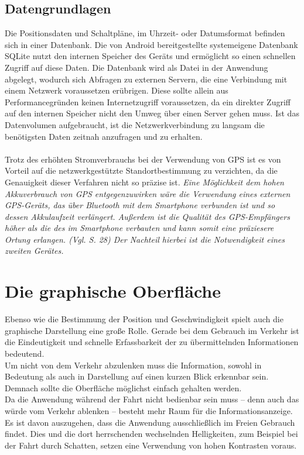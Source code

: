 \subsection{Datengrundlagen}
Die Positionsdaten und Schaltpläne, im Uhrzeit- oder Datumsformat befinden sich in einer Datenbank. Die von Android bereitgestellte systemeigene Datenbank SQLite nutzt den internen Speicher des Geräts und ermöglicht so einen schnellen Zugriff auf diese Daten. Die Datenbank wird als Datei in der Anwendung abgelegt, wodurch sich Abfragen zu externen Servern, die eine Verbindung mit einem Netzwerk voraussetzen erübrigen. Diese sollte allein aus Performancegründen keinen Internetzugriff voraussetzen, da ein direkter Zugriff auf den internen Speicher nicht den Umweg über einen Server gehen muss. Ist das Datenvolumen aufgebraucht, ist die Netzwerkverbindung zu langsam die benötigsten Daten zeitnah anzufragen und zu erhalten.\\\\
Trotz des erhöhten Stromverbrauchs bei der Verwendung von \gls{GPS} ist es von Vorteil auf die netzwerkgestützte Standortbestimmung zu verzichten, da die Genauigkeit dieser Verfahren nicht so präzise ist. 
\textit{Eine Möglichkeit dem hohen Akkuverbrauch von \gls{GPS} entgegenzuwirken wäre die Verwendung eines externen \gls{GPS}-Geräts, das über Bluetooth mit dem \gls{Smartphone} verbunden ist und so dessen Akkulaufzeit verlängert. Außerdem ist die Qualität des \gls{GPS}-Empfängers höher als die des im \gls{Smartphone} verbauten und kann somit eine präziesere Ortung erlangen. (Vgl. \cite{gps} S. 28) Der Nachteil hierbei ist die Notwendigkeit eines zweiten Gerätes.} 
\clearpage
\section{Die graphische Oberfläche}
Ebenso wie die Bestimmung der Position und Geschwindigkeit spielt auch die graphische Darstellung eine große Rolle. Gerade bei dem Gebrauch im Verkehr ist die Eindeutigkeit und schnelle Erfassbarkeit der zu übermittelnden Informationen bedeutend.  \\
Um nicht von dem Verkehr abzulenken muss die Information, sowohl in Bedeutung als auch in Darstellung auf einen kurzen Blick erkennbar sein. Demnach sollte die Oberfläche möglichst einfach gehalten werden.\\
Da die Anwendung während der Fahrt nicht bedienbar sein muss -- denn auch das würde vom Verkehr ablenken -- besteht mehr Raum für die Informationsanzeige. 
Es ist davon auszugehen, dass die Anwendung ausschließlich im Freien Gebrauch findet. Dies und die dort herrschenden wechselnden Helligkeiten, zum Beispiel bei der Fahrt durch Schatten, setzen eine Verwendung von hohen Kontrasten voraus.
